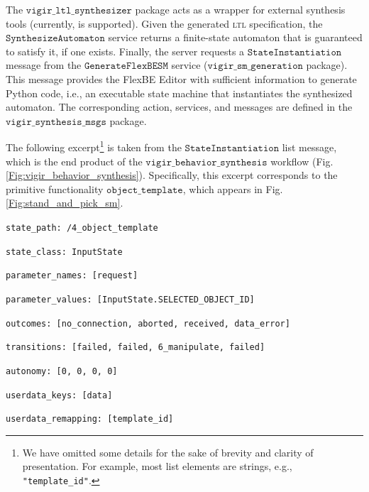 The $\mathtt{vigir\_ltl\_synthesizer}$ package acts as a wrapper for external synthesis tools (currently, \cite{SLUGS} is supported).
Given the generated \textsc{ltl} specification, the $\mathtt{Synthesize Automaton}$ service returns a finite-state automaton that is guaranteed to satisfy it, if one exists.
Finally, the server requests a $\mathtt{State Instantiation}$ message from the $\mathtt{Generate FlexBE SM}$ service ($\mathtt{vigir\_sm\_generation}$ package).
This message provides the FlexBE Editor with sufficient information to generate Python code, i.e., an executable state machine that instantiates the synthesized automaton.
The corresponding action, services, and messages are defined in the $\mathtt{vigir\_synthesis\_msgs}$ package.

The following excerpt\footnote{We have omitted some details for the sake of brevity and clarity of presentation. For example, most list elements are strings, e.g., \scriptsize{\texttt{"template\_id"}}.}
 is taken from the $\mathtt{State Instantiation}$ list message, which is the end product of the $\mathtt{vigir\_behavior\_synthesis}$ workflow (Fig. \ref{Fig:vigir_behavior_synthesis}).
Specifically, this excerpt corresponds to the primitive functionality $\mathtt{object\_template}$, which appears in Fig. \ref{Fig:stand_and_pick_sm}.

\begin{description}
\setlength{\itemindent}{-.4in}
	\item \scriptsize{\texttt{state\_path: /4\_object\_template}}
	\item \scriptsize{\texttt{state\_class: InputState}}
	\item \scriptsize{\texttt{parameter\_names: [request]}}
	\item \scriptsize{\texttt{parameter\_values: [InputState.SELECTED\_OBJECT\_ID]}}
	\item \scriptsize{\texttt{outcomes: [no\_connection, aborted, received, data\_error]}}
	\item \scriptsize{\texttt{transitions: [failed, failed, 6\_manipulate, failed]}}
	\item \scriptsize{\texttt{autonomy: [0, 0, 0, 0]}}
	\item \scriptsize{\texttt{userdata\_keys: [data]}}
	\item \scriptsize{\texttt{userdata\_remapping: [template\_id]}}
\end{description}


